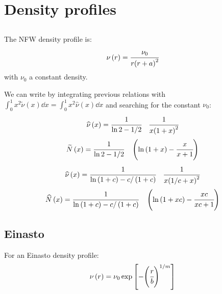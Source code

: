 \section{Density profiles}
\label{sec:density_profiles}

\subsection{\citet{NFW+97}}

The NFW density profile is:
%
\begin{equation}
    \nu \left(r\right) = \cfrac{\nu_0}{r {\left(r+a\right)}^2}
\end{equation}
%
with $\nu_0$ a constant density.

We can write by integrating previous relations with $\int_0^1
x^2\widetilde\nu\left(x\right)\dd x=\int_0^1 x^2\widehat\nu\left(x\right)\dd x$  and searching for the
constant $\nu_0$:
%
\begin{equation}
    \widehat\nu\left(x\right)=
        \cfrac{1}{\ln2-1/2}
        \quad\cfrac{1}{x{\left(1+x\right)}^2}
\end{equation}
%
\begin{equation}
    \widetilde{N}\left(x\right)=\cfrac{1}{\ln2-1/2}
        \quad\left(\ln\left(1+x\right)-\cfrac{x}{x+1}\right)
\end{equation}
%
\begin{equation}
    \widehat\nu\left(x\right)=
        \cfrac{1}{\ln\left(1+c\right)-c/ \left(1+c\right)}
        \quad\cfrac{1}{x{\left(1/c+x\right)}^2}
\end{equation}
%
\begin{equation}
    \widehat{N}\left(x\right)=
        \cfrac{1}{\ln \left(1+c\right)-c/ \left(1+c\right)}
        \quad\left(\ln\left(1+xc\right)-\cfrac{xc}{xc+1}\right)
\end{equation}

\subsection{Einasto}
\label{sub:einasto}

For an Einasto density profile:
\begin{equation}
    \nu \left(r\right) = \nu_0 \exp
    \left[- {\left(\cfrac{r}{b}\right)}^{1/m}\right]
\end{equation}

